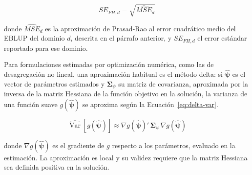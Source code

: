\begin{equation}
    SE_{FH,d} = \sqrt{\widehat{MSE}_d}
    \label{eq:se}
\end{equation}

\noindent donde $\widehat{MSE}_d$ es la aproximación de Prasad-Rao al error cuadrático medio del EBLUP del dominio $d$, descrita en el párrafo anterior, y $SE_{FH,d}$ el error estándar reportado para ese dominio.

Para formulaciones estimadas por optimización numérica, como las de desagregación no lineal, una aproximación habitual es el método delta: si $\hat{\boldsymbol{\psi}}$ es el vector de parámetros estimados y $\boldsymbol{\Sigma}_{\psi}$ su matriz de covarianza, aproximada por la inversa de la matriz Hessiana de la función objetivo en la solución, la varianza de una función suave $g(\hat{\boldsymbol{\psi}})$ se aproxima según la Ecuación~\ref{eq:delta-var}.

\begin{equation}
    \widehat{\operatorname{Var}}\!\left[g(\hat{\boldsymbol{\psi}})\right] \approx \nabla g(\hat{\boldsymbol{\psi}})'\, \boldsymbol{\Sigma}_{\psi}\, \nabla g(\hat{\boldsymbol{\psi}})
    \label{eq:delta-var}
\end{equation}

\noindent donde $\nabla g(\hat{\boldsymbol{\psi}})$ es el gradiente de $g$ respecto a los parámetros, evaluado en la estimación. La aproximación es local y su validez requiere que la matriz Hessiana sea definida positiva en la solución.

